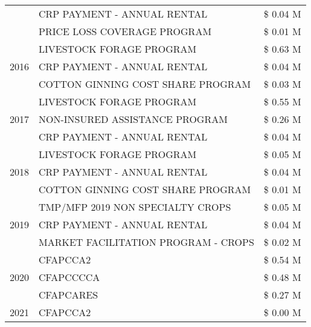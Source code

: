 \begin{tabular}{llr}
 & CRP PAYMENT - ANNUAL RENTAL & \$ 0.04 M \\
 & PRICE LOSS COVERAGE PROGRAM & \$ 0.01 M \\
\cline{1-3}
\multirow[t]{3}{*}{2016} & LIVESTOCK FORAGE PROGRAM                      & \$ 0.63 M \\
 & CRP PAYMENT - ANNUAL RENTAL                   & \$ 0.04 M \\
 & COTTON GINNING COST SHARE PROGRAM             & \$ 0.03 M \\
\cline{1-3}
\multirow[t]{3}{*}{2017} & LIVESTOCK FORAGE PROGRAM & \$ 0.55 M \\
 & NON-INSURED ASSISTANCE PROGRAM & \$ 0.26 M \\
 & CRP PAYMENT - ANNUAL RENTAL & \$ 0.04 M \\
\cline{1-3}
\multirow[t]{3}{*}{2018} & LIVESTOCK FORAGE PROGRAM & \$ 0.05 M \\
 & CRP PAYMENT - ANNUAL RENTAL & \$ 0.04 M \\
 & COTTON GINNING COST SHARE PROGRAM & \$ 0.01 M \\
\cline{1-3}
\multirow[t]{3}{*}{2019} & TMP/MFP 2019 NON SPECIALTY CROPS & \$ 0.05 M \\
 & CRP PAYMENT - ANNUAL RENTAL & \$ 0.04 M \\
 & MARKET FACILITATION PROGRAM - CROPS & \$ 0.02 M \\
\cline{1-3}
\multirow[t]{3}{*}{2020} & CFAPCCA2 & \$ 0.54 M \\
 & CFAPCCCCA & \$ 0.48 M \\
 & CFAPCARES & \$ 0.27 M \\
\cline{1-3}
2021 & CFAPCCA2 & \$ 0.00 M \\
\cline{1-3}
\bottomrule
\end{tabular}
